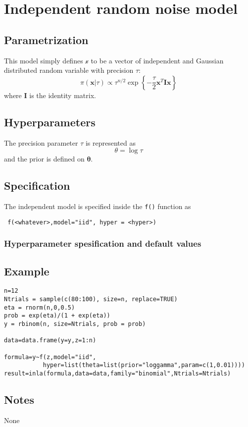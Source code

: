 \documentclass[a4paper,11pt]{article}
\begin{document}
\section*{Independent random noise model}

\subsection*{Parametrization}

This model simply defines $\mathcal{x}$ to be a vector of independent
and Gaussian distributed random variable with precision $\tau$:
\[
\pi(\mathbf{x}|\tau) \propto \tau^{n/2}\exp\left\{
  -\frac{\tau}{2}\mathbf{x}^T\mathbf{I}\mathbf{x} \right\}
\]
where $\mathbf{I}$ is the identity matrix.
\subsection*{Hyperparameters}

The precision parameter $\tau$ is represented as
\begin{displaymath}
    \theta =\log \tau
\end{displaymath}
and the prior is defined on $\mathbf{\theta}$.

\subsection*{Specification}

The independent model is specified inside the {\tt f()} function as
\begin{verbatim}
 f(<whatever>,model="iid", hyper = <hyper>)
\end{verbatim}

\subsubsection*{Hyperparameter spesification and default values}


\subsection*{Example}

\begin{verbatim}
n=12
Ntrials = sample(c(80:100), size=n, replace=TRUE)
eta = rnorm(n,0,0.5)
prob = exp(eta)/(1 + exp(eta))
y = rbinom(n, size=Ntrials, prob = prob)

data=data.frame(y=y,z=1:n)

formula=y~f(z,model="iid",
           hyper=list(theta=list(prior="loggamma",param=c(1,0.01))))
result=inla(formula,data=data,family="binomial",Ntrials=Ntrials)
\end{verbatim}


\subsection*{Notes}

None
\end{document}
